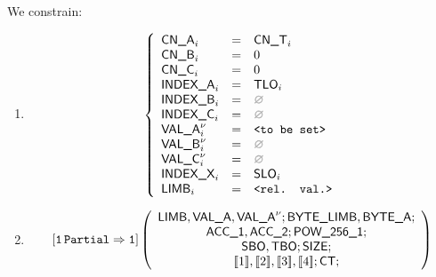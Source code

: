 \begin{center}
\end{center}

We constrain:
\begin{enumerate}
	\item 
		\[
			\left\{ \begin{array}{lclr}
				\cnA      _{i}       & = & \cnT_{i}            \\
				\cnB      _{i}       & = & 0                   \\
				\cnC      _{i}       & = & 0                   \\
				\indexA   _{i}       & = & \tlo_{i}            \\
				\indexB   _{i}       & = & \nothing            \\
				\indexC   _{i}       & = & \nothing            \\
				\valA     _{i}\new{} & = & \valueToBeSet       \\
				\valB     _{i}\new{} & = & \nothing            \\
				\valC     _{i}\new{} & = & \nothing            \\
				\indexX   _{i}       & = & \slo_{i}            \\
				\limb     _{i}       & = & \relevantValue      \\
			\end{array} \right.
		\]
	\item 
		\[
			\onePartialToOne
			\left( \begin{array}{c}
				\limb{}, \valA{}, \valA\new{};
				\byteLimb{}, \byteA{};\\
				\acc{1}, \acc{2}; \pow{1}; \\
				\sbo{}, \tbo{}; \size{};\\
				\bit{1}, \bit{2}, \bit{3}, \bit{4}; \ct{};
			\end{array} \right)
		\]
\end{enumerate}
